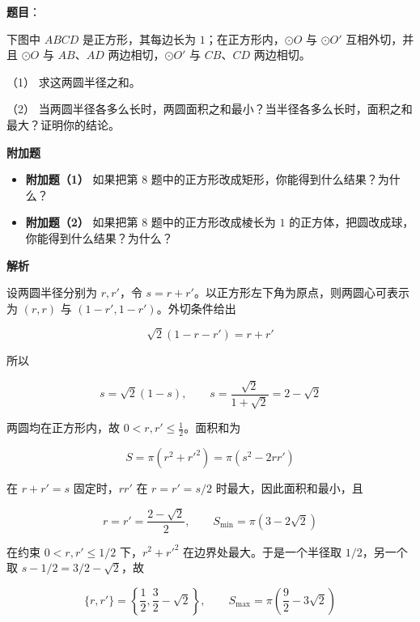 \begin{answer}

\textbf{题目}：

下图中 $ABCD$ 是正方形，其每边长为 $1$；在正方形内，$\odot O$ 与 $\odot O'$ 互相外切，并且 $\odot O$ 与 $AB$、$AD$ 两边相切，$\odot O'$ 与 $CB$、$CD$ 两边相切。
\nopagebreak[4]
\begin{center}\end{center}
\nopagebreak[4]
（1） 求这两圆半径之和。

（2） 当两圆半径各多么长时，两圆面积之和最小？当半径各多么长时，面积之和最大？证明你的结论。

\textbf{附加题}

\begin{itemize}
\item \textbf{附加题（1）} 如果把第 8 题中的正方形改成矩形，你能得到什么结果？为什么？
\end{itemize}

\begin{itemize}
\item \textbf{附加题（2）} 如果把第 8 题中的正方形改成棱长为 $1$ 的正方体，把圆改成球，你能得到什么结果？为什么？
\end{itemize}

\textbf{解析}


设两圆半径分别为 $r,r'$，令 $s=r+r'$。以正方形左下角为原点，则两圆心可表示为 $(r,r)$ 与 $(1-r',1-r')$。外切条件给出

\nopagebreak[4]
\[\sqrt2(1-r-r')=r+r'\]

所以

\nopagebreak[4]
\[s=\sqrt2(1-s),\qquad s=\frac{\sqrt2}{1+\sqrt2}=2-\sqrt2\]


两圆均在正方形内，故 $0<r,r'\leqslant\frac12$。面积和为

\nopagebreak[4]
\[S=\pi(r^2+r'^2)=\pi(s^2-2rr')\]

在 $r+r'=s$ 固定时，$rr'$ 在 $r=r'=s/2$ 时最大，因此面积和最小，且

\nopagebreak[4]
\[r=r'=\frac{2-\sqrt2}{2},\qquad S_{\min}=\pi(3-2\sqrt2)\]

在约束 $0<r,r'\leqslant1/2$ 下，$r^2+r'^2$ 在边界处最大。于是一个半径取 $1/2$，另一个取 $s-1/2=3/2-\sqrt2$，故

\nopagebreak[4]
\[\{r,r'\}=\left\{\frac12,\frac32-\sqrt2\right\},\qquad S_{\max}=\pi\left(\frac92-3\sqrt2\right)\]
\nopagebreak[4]
\begin{center}\end{center}
\nopagebreak[4]
\nopagebreak[4]
\begin{center}\end{center}
\nopagebreak[4]


\end{answer}
